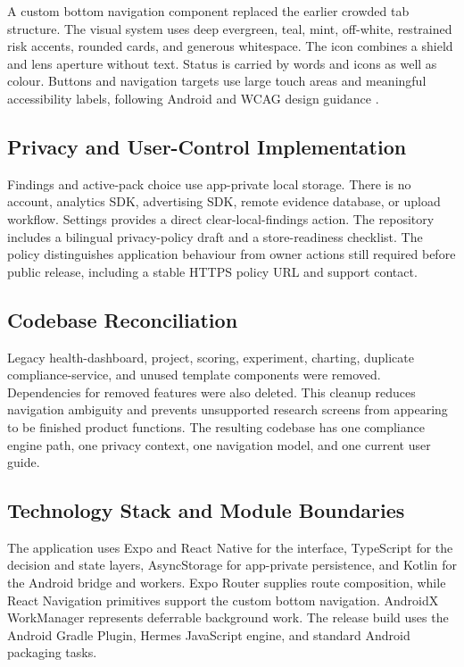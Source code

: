 A custom bottom navigation component replaced the earlier crowded tab structure. The visual system uses deep evergreen, teal, mint, off-white, restrained risk accents, rounded cards, and generous whitespace. The icon combines a shield and lens aperture without text. Status is carried by words and icons as well as colour. Buttons and navigation targets use large touch areas and meaningful accessibility labels, following Android and WCAG design guidance \cite{androidaccess,wcag22}.

\subsection{Privacy and User-Control Implementation}

Findings and active-pack choice use app-private local storage. There is no account, analytics SDK, advertising SDK, remote evidence database, or upload workflow. Settings provides a direct clear-local-findings action. The repository includes a bilingual privacy-policy draft and a store-readiness checklist. The policy distinguishes application behaviour from owner actions still required before public release, including a stable HTTPS policy URL and support contact.

\subsection{Codebase Reconciliation}

Legacy health-dashboard, project, scoring, experiment, charting, duplicate compliance-service, and unused template components were removed. Dependencies for removed features were also deleted. This cleanup reduces navigation ambiguity and prevents unsupported research screens from appearing to be finished product functions. The resulting codebase has one compliance engine path, one privacy context, one navigation model, and one current user guide.

\subsection{Technology Stack and Module Boundaries}

The application uses Expo and React Native for the interface, TypeScript for the decision and state layers, AsyncStorage for app-private persistence, and Kotlin for the Android bridge and workers. Expo Router supplies route composition, while React Navigation primitives support the custom bottom navigation. AndroidX WorkManager represents deferrable background work. The release build uses the Android Gradle Plugin, Hermes JavaScript engine, and standard Android packaging tasks.

